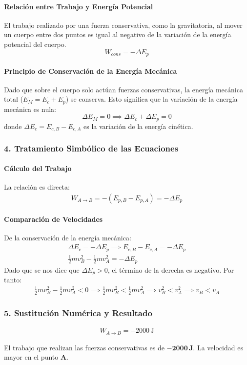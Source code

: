\paragraph{Relación entre Trabajo y Energía Potencial}
El trabajo realizado por una fuerza conservativa, como la gravitatoria, al mover un cuerpo entre dos puntos es igual al negativo de la variación de la energía potencial del cuerpo.
$$ W_{cons} = -\Delta E_p $$

\paragraph{Principio de Conservación de la Energía Mecánica}
Dado que sobre el cuerpo solo actúan fuerzas conservativas, la energía mecánica total ($E_M = E_c + E_p$) se conserva. Esto significa que la variación de la energía mecánica es nula:
$$ \Delta E_M = 0 \implies \Delta E_c + \Delta E_p = 0 $$
donde $\Delta E_c = E_{c,B} - E_{c,A}$ es la variación de la energía cinética.

\subsubsection*{4. Tratamiento Simbólico de las Ecuaciones}
\paragraph{Cálculo del Trabajo}
La relación es directa:
\begin{gather}
    W_{A \to B} = -(E_{p,B} - E_{p,A}) = -\Delta E_p
\end{gather}

\paragraph{Comparación de Velocidades}
De la conservación de la energía mecánica:
\begin{gather}
    \Delta E_c = -\Delta E_p \implies E_{c,B} - E_{c,A} = -\Delta E_p \nonumber \\
    \frac{1}{2}mv_B^2 - \frac{1}{2}mv_A^2 = -\Delta E_p
\end{gather}
Dado que se nos dice que $\Delta E_p > 0$, el término de la derecha es negativo. Por tanto:
\begin{gather}
    \frac{1}{2}mv_B^2 - \frac{1}{2}mv_A^2 < 0 \implies \frac{1}{2}mv_B^2 < \frac{1}{2}mv_A^2 \implies v_B^2 < v_A^2 \implies v_B < v_A
\end{gather}

\subsubsection*{5. Sustitución Numérica y Resultado}
\begin{gather}
    W_{A \to B} = -2000 \, \text{J}
\end{gather}
\begin{cajaresultado}
El trabajo que realizan las fuerzas conservativas es de $\boldsymbol{-2000 \, \textbf{J}}$.
La velocidad es mayor en el punto \textbf{A}.
\end{cajaresultado}

